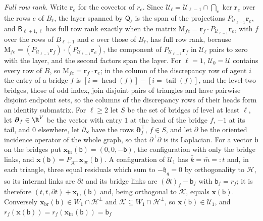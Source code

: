 \emph{Full row rank.} Write \(\mathbf r_e\) for the covector of \(r_e\).
Since \(\mathcal U_\ell=\mathcal U_{\ell-1}\cap\bigcap_e\ker\mathbf r_e\) over
the rows \(e\) of \(B_\ell\), the layer spanned by \(\mathsf Q_\ell\) is the
span of the projections \(P_{\mathcal U_{\ell-1}}\mathbf r_e\), and
\(\mathsf B_{\ell+1,\ell}\) has full row rank exactly when the matrix
\(\mathrm M_{fe}=\mathbf r_f\cdot P_{\mathcal U_{\ell-1}}\mathbf r_e\), with
\(f\) over the rows of \(B_{\ell+1}\) and \(e\) over those of \(B_\ell\), has
full row rank, because
\(\mathrm M_{fe}=(P_{\mathcal U_{\ell-1}}\mathbf r_f)\cdot(P_{\mathcal U_{\ell-1}}\mathbf r_e)\),
the component of \(P_{\mathcal U_{\ell-1}}\mathbf r_f\) in \(\mathcal U_\ell\)
pairs to zero with the layer, and the second factors span the layer. For
\(\ell=1\), \(\mathcal U_0=\mathcal U\) contains every row of \(B\), so
\(\mathrm M_{fe}=\mathbf r_f\cdot\mathbf r_e\); in the column of the
discrepancy row of agent \(i\) the entry of a bridge \(f\) is
\([i=\operatorname{head}(f)]-[i=\operatorname{tail}(f)]\), and the level-two
bridges, those of odd index, join disjoint pairs of triangles and have
pairwise disjoint endpoint sets, so the columns of the discrepancy rows of
their heads form an identity submatrix. For \(\ell\ge2\) let \(S\) be the
set of bridges of level at least \(\ell\), let \(\boldsymbol\partial_f\in\R^V\)
be the vector with entry \(1\) at the head of the bridge \(f\), \(-1\) at its
tail, and \(0\) elsewhere, let \(\partial_S\) have the rows
\(\boldsymbol\partial_f^\top\), \(f\in S\), and let \(\partial\) be the
oriented incidence operator of the whole graph, so that
\(\partial^\top\partial\) is its Laplacian. For a vector \(\mathsf b\) on the
bridges put \(\mathbf x_{\mathrm{br}}(\mathsf b)=(0,0,-\mathsf b)\), the
configuration with only the bridge links, and
\(\mathbf x(\mathsf b)=P_{\mathcal K^\perp}\mathbf x_{\mathrm{br}}(\mathsf b)\).
A configuration of \(\mathcal U_1\) has \(\bar k=\bar m=:t\) and, in each
triangle, three equal residuals which sum to \(-\mathfrak h_q=0\) by
orthogonality to \(\mathcal H\), so its internal links are \(\partial t\) and
its bridge links are \((\partial t)_f-\mathsf b_f\) with \(\mathsf b_f=r_f\);
it is therefore \((t,t,\partial t)+\mathbf x_{\mathrm{br}}(\mathsf b)\) and,
being orthogonal to \(\mathcal K\), equals \(\mathbf x(\mathsf b)\).
Conversely \(\mathbf x_{\mathrm{br}}(\mathsf b)\in W_1\cap\mathcal H^\perp\)
and \(\mathcal K\subseteq W_1\cap\mathcal H^\perp\), so
\(\mathbf x(\mathsf b)\in\mathcal U_1\), and
\(r_f(\mathbf x(\mathsf b))=r_f(\mathbf x_{\mathrm{br}}(\mathsf b))=\mathsf b_f\)
